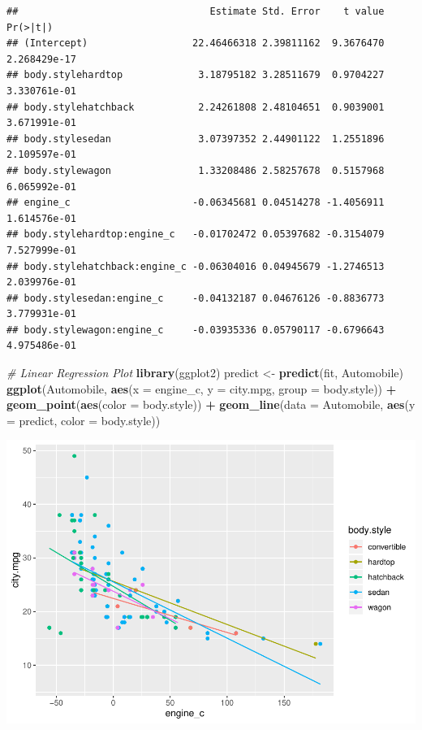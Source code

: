 \documentclass[]{article}
\newenvironment{Shaded}{\begin{snugshade}}{\end{snugshade}}
\newcommand{\KeywordTok}[1]{\textcolor[rgb]{0.13,0.29,0.53}{\textbf{#1}}}
\newcommand{\DataTypeTok}[1]{\textcolor[rgb]{0.13,0.29,0.53}{#1}}
\newcommand{\StringTok}[1]{\textcolor[rgb]{0.31,0.60,0.02}{#1}}
\newcommand{\CommentTok}[1]{\textcolor[rgb]{0.56,0.35,0.01}{\textit{#1}}}
\newcommand{\OperatorTok}[1]{\textcolor[rgb]{0.81,0.36,0.00}{\textbf{#1}}}
\newcommand{\NormalTok}[1]{#1}
\begin{document}
\begin{verbatim}
##                                 Estimate Std. Error    t value     Pr(>|t|)
## (Intercept)                  22.46466318 2.39811162  9.3676470 2.268429e-17
## body.stylehardtop             3.18795182 3.28511679  0.9704227 3.330761e-01
## body.stylehatchback           2.24261808 2.48104651  0.9039001 3.671991e-01
## body.stylesedan               3.07397352 2.44901122  1.2551896 2.109597e-01
## body.stylewagon               1.33208486 2.58257678  0.5157968 6.065992e-01
## engine_c                     -0.06345681 0.04514278 -1.4056911 1.614576e-01
## body.stylehardtop:engine_c   -0.01702472 0.05397682 -0.3154079 7.527999e-01
## body.stylehatchback:engine_c -0.06304016 0.04945679 -1.2746513 2.039976e-01
## body.stylesedan:engine_c     -0.04132187 0.04676126 -0.8836773 3.779931e-01
## body.stylewagon:engine_c     -0.03935336 0.05790117 -0.6796643 4.975486e-01
\end{verbatim}

\begin{Shaded}
\begin{Highlighting}[]
\CommentTok{# Linear Regression Plot}
\KeywordTok{library}\NormalTok{(ggplot2)}
\NormalTok{predict <-}\StringTok{ }\KeywordTok{predict}\NormalTok{(fit, Automobile)}
\KeywordTok{ggplot}\NormalTok{(Automobile, }\KeywordTok{aes}\NormalTok{(}\DataTypeTok{x =}\NormalTok{ engine_c, }\DataTypeTok{y =}\NormalTok{ city.mpg, }\DataTypeTok{group =}\NormalTok{ body.style)) }\OperatorTok{+}\StringTok{ }
\StringTok{    }\KeywordTok{geom_point}\NormalTok{(}\KeywordTok{aes}\NormalTok{(}\DataTypeTok{color =}\NormalTok{ body.style)) }\OperatorTok{+}\StringTok{ }\KeywordTok{geom_line}\NormalTok{(}\DataTypeTok{data =}\NormalTok{ Automobile, }
    \KeywordTok{aes}\NormalTok{(}\DataTypeTok{y =}\NormalTok{ predict, }\DataTypeTok{color =}\NormalTok{ body.style))}
\end{Highlighting}
\end{Shaded}

\begin{center}\includegraphics{project2_files/figure-latex/unnamed-chunk-3-1} \end{center}
\end{document}

